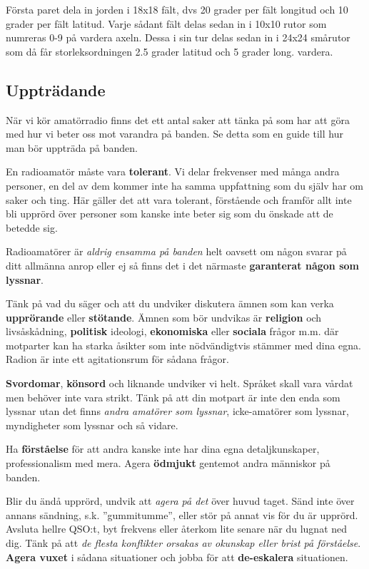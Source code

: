 Första paret dela in jorden i 18x18 fält, dvs 20 grader per fält longitud och 10 grader per fält latitud. Varje sådant fält delas sedan in i 10x10 rutor som numreras 0-9 på vardera axeln. Dessa i sin tur delas sedan in i 24x24 smårutor som då får storleksordningen 2.5 grader latitud och 5 grader long. vardera.

\subsection{Uppträdande}

När vi kör amatörradio finns det ett antal saker att tänka på som har att göra med hur vi beter oss mot varandra på banden. Se detta som en guide till hur man bör uppträda på banden.

En radioamatör måste vara \textbf{tolerant}. Vi delar frekvenser med många andra personer, en del av dem kommer inte ha samma uppfattning som du själv har om saker och ting. Här gäller det att vara tolerant, förstående och framför allt inte bli upprörd över personer som kanske inte beter sig som du önskade att de betedde sig.

Radioamatörer är \emph{aldrig ensamma på banden} helt oavsett om någon svarar på ditt allmänna anrop eller ej så finns det i det närmaste \textbf{garanterat någon som lyssnar}. 

Tänk på vad du säger och att du undviker diskutera ämnen som kan verka \textbf{upprörande} eller \textbf{stötande}. Ämnen som bör undvikas är \textbf{religion} och livs\-å\-skå\-d\-ni\-ng, \textbf{politisk} ideologi, \textbf{ekonomiska} eller \textbf{sociala} frågor m.m. där motparter kan ha starka åsikter som inte nödvändigtvis stämmer med dina egna. Radion är inte ett agitationsrum för sådana frågor.

\textbf{Svordomar}, \textbf{könsord} och liknande undviker vi helt. Språket skall vara vårdat men behöver inte vara strikt. Tänk på att din motpart är inte den enda som lyssnar utan det finns \textit{andra amatörer som lyssnar}, icke-amatörer som lyssnar, myndigheter som lyssnar och så vidare.

Ha \textbf{förståelse} för att andra kanske inte har dina egna detaljkunskaper, professionalism med mera. Agera \textbf{ödmjukt} gentemot andra människor på banden.

Blir du ändå upprörd, undvik att \emph{agera på det} över huvud taget. Sänd inte över annans sändning, s.k. ''gummitumme'', eller stör på annat vis för du är upprörd. Avsluta hellre QSO:t, byt frekvens eller återkom lite senare när du lugnat ned dig. Tänk på att \textit{de flesta konflikter orsakas av okunskap eller brist på förståelse}. \textbf{Agera vuxet} i sådana situationer och jobba för att \textbf{de-eskalera} situationen.

